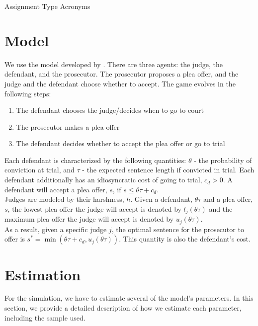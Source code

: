 \documentclass[11pt]{article}
\theoremstyle{ModifiedStyle}
\theoremstyle{ModifiedStyle}
\begin{document}
      \begin{table}[H]
        \centering
        \caption{Assignment Type Acronyms}
        \label{tab-assignment-types}
        
      \end{table}

\section{Model}
  We use the model developed by \cite{wang2019}. There are three agents: the judge, the defendant, and the prosecutor. The prosecutor proposes a plea offer, and the judge and the defendant choose whether to accept. The game evolves in the following steps:

  \begin{enumerate}
    \item The defendant chooses the judge/decides when to go to court
    \item The prosecutor makes a plea offer
    \item The defendant decides whether to accept the plea offer or go to trial
  \end{enumerate}

  Each defendant is characterized by the following quantities: $\theta$ - the probability of conviction at trial, and $\tau$ - the expected sentence length if convicted in trial. Each defendant additionally has an idiosyncratic cost of going to trial, $c_d >0$. A defendant will accept a plea offer, $s$, if $s \leq \theta \tau + c_d$.\\

  Judges are modeled by their harshness, $h$. Given a defendant, $\theta \tau$ and a plea offer, $s$, the lowest plea offer the judge will accept is denoted by $l_j(\theta \tau)$ and the maximum plea offer the judge will accept is denoted by $u_j(\theta \tau)$.\\

  As a result, given a specific judge $j$, the optimal sentence for the prosecutor to offer is $s^* = \min(\theta \tau + c_d,u_j(\theta \tau))$. This quantity is also the defendant's cost.

\section{Estimation}
  For the simulation, we have to estimate several of the model's parameters. In this section, we provide a detailed description of how we estimate each parameter, including the sample used.
\end{document}

